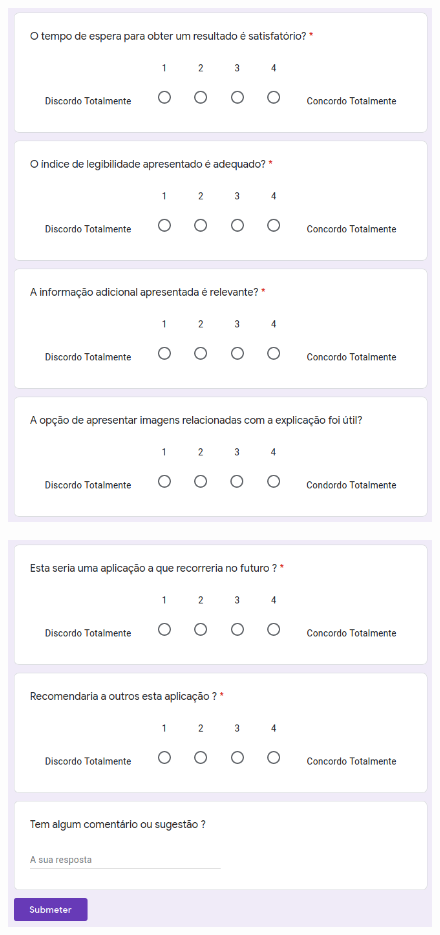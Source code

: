 \begin{figure}[H]
    \centering
    \includegraphics[scale=0.7]{appendices/assets/survey3.png}
    \label{fig:survey1}
\end{figure}

\begin{figure}[H]
    \centering
    \includegraphics[scale=0.7]{appendices/assets/survey4.png}
    \label{fig:survey1}
\end{figure}


